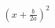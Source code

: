 \documentclass[preview]{standalone}
\begin{document}
\begin{align*}
\left ( x + \frac{b}{2a} \right )^{2}
\end{align*}
\end{document}
